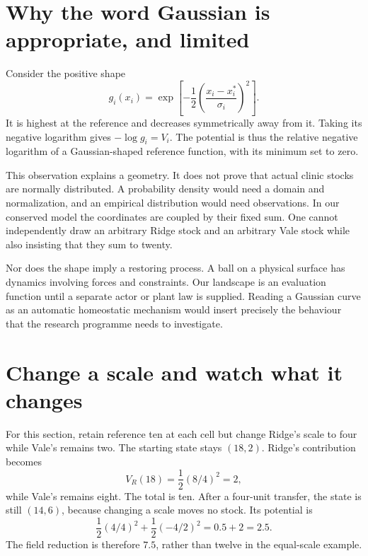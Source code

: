 \section{Why the word Gaussian is appropriate, and limited}

Consider the positive shape
\begin{equation}
g_i(x_i)=\exp\!\left[-\frac12\left(\frac{x_i-x_i^*}{\sigma_i}\right)^2\right].
\end{equation}
It is highest at the reference and decreases symmetrically away from it. Taking its negative logarithm gives \(-\log g_i=V_i\). The potential is thus the relative negative logarithm of a Gaussian-shaped reference function, with its minimum set to zero.

This observation explains a geometry. It does not prove that actual clinic stocks are normally distributed. A probability density would need a domain and normalization, and an empirical distribution would need observations. In our conserved model the coordinates are coupled by their fixed sum. One cannot independently draw an arbitrary Ridge stock and an arbitrary Vale stock while also insisting that they sum to twenty.

Nor does the shape imply a restoring process. A ball on a physical surface has dynamics involving forces and constraints. Our landscape is an evaluation function until a separate actor or plant law is supplied. Reading a Gaussian curve as an automatic homeostatic mechanism would insert precisely the behaviour that the research programme needs to investigate.

\section{Change a scale and watch what it changes}

For this section, retain reference ten at each cell but change Ridge's scale to four while Vale's remains two. The starting state stays \((18,2)\). Ridge's contribution becomes
\begin{equation}
V_R(18)=\frac12(8/4)^2=2,
\end{equation}
while Vale's remains eight. The total is ten. After a four-unit transfer, the state is still \((14,6)\), because changing a scale moves no stock. Its potential is
\begin{equation}
\frac12(4/4)^2+\frac12(-4/2)^2=0.5+2=2.5.
\end{equation}
The field reduction is therefore \(7.5\), rather than twelve in the equal-scale example.

